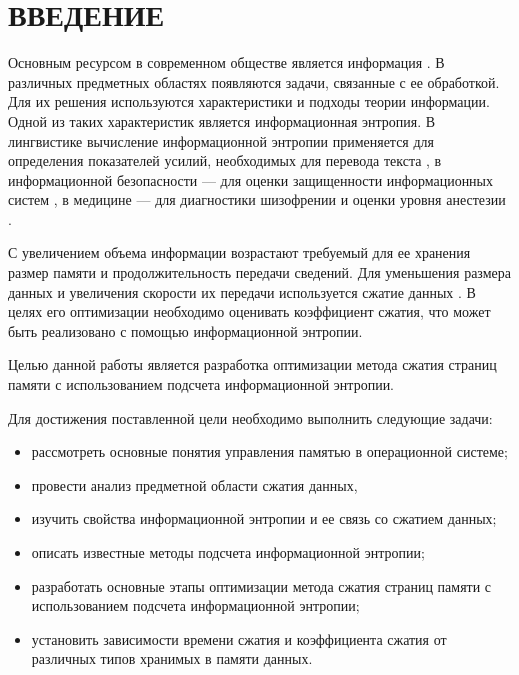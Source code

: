 \chapter*{ВВЕДЕНИЕ}

Основным ресурсом в современном обществе является информация \cite{society}. В различных предметных областях появляются задачи, связанные с ее обработкой. Для их решения используются характеристики и подходы теории информации. Одной из таких характеристик является информационная энтропия. В лингвистике вычисление информационной энтропии применяется для определения показателей усилий, необходимых для перевода текста \cite{translation}, в информационной безопасности --- для оценки защищенности информационных систем \cite{security}, в медицине --- для диагностики шизофрении \cite{mind} и оценки уровня анестезии \cite{anesthesia}.

С увеличением объема информации возрастают требуемый для ее хранения размер памяти и продолжительность передачи сведений. Для уменьшения размера данных и увеличения скорости их передачи используется сжатие данных \cite{data-compression}. В целях его оптимизации необходимо оценивать коэффициент сжатия, что может быть реализовано с помощью информационной энтропии.

Целью данной работы является разработка оптимизации метода сжатия страниц памяти с использованием подсчета информационной энтропии.

Для достижения поставленной цели необходимо выполнить следующие задачи:

\begin{itemize}
	\item рассмотреть основные понятия управления памятью в операционной системе;
	\item провести анализ предметной области сжатия данных, 
	\item изучить свойства информационной энтропии и ее связь со сжатием данных;
	\item описать известные методы подсчета информационной энтропии;
	\item разработать основные этапы оптимизации метода сжатия страниц памяти с использованием подсчета информационной энтропии;
	\item установить зависимости времени сжатия и коэффициента сжатия от различных типов хранимых в памяти данных.
\end{itemize}